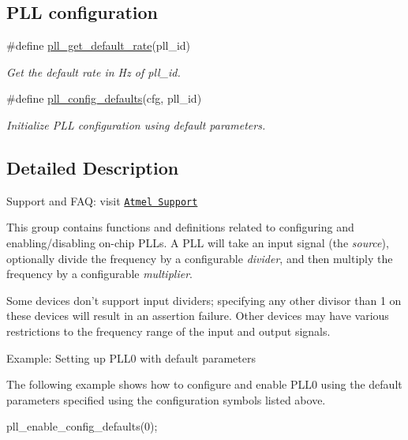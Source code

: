 \subsection*{P\-L\-L configuration}
\begin{DoxyCompactItemize}
\item 
\#define \hyperlink{group__pll__group_ga16c8db5e3f1a2c759a88371120579c4d}{pll\-\_\-get\-\_\-default\-\_\-rate}(pll\-\_\-id)
\begin{DoxyCompactList}\small\item\em Get the default rate in Hz of {\itshape pll\-\_\-id}. \end{DoxyCompactList}\item 
\#define \hyperlink{group__pll__group_ga2b9ba9ce6a7290303f6e8d41191fd0d8}{pll\-\_\-config\-\_\-defaults}(cfg, pll\-\_\-id)
\begin{DoxyCompactList}\small\item\em Initialize P\-L\-L configuration using default parameters. \end{DoxyCompactList}\end{DoxyCompactItemize}


\subsection{Detailed Description}
Support and F\-A\-Q\-: visit \href{http://www.atmel.com/design-support/}{\tt Atmel Support}

This group contains functions and definitions related to configuring and enabling/disabling on-\/chip P\-L\-Ls. A P\-L\-L will take an input signal (the {\itshape source}), optionally divide the frequency by a configurable {\itshape divider}, and then multiply the frequency by a configurable {\itshape multiplier}.

Some devices don't support input dividers; specifying any other divisor than 1 on these devices will result in an assertion failure. Other devices may have various restrictions to the frequency range of the input and output signals.

\begin{DoxyParagraph}{Example\-: Setting up P\-L\-L0 with default parameters}

\end{DoxyParagraph}
The following example shows how to configure and enable P\-L\-L0 using the default parameters specified using the configuration symbols listed above. 
\begin{DoxyCode}
        pll\_enable\_config\_defaults(0); 
\end{DoxyCode}


